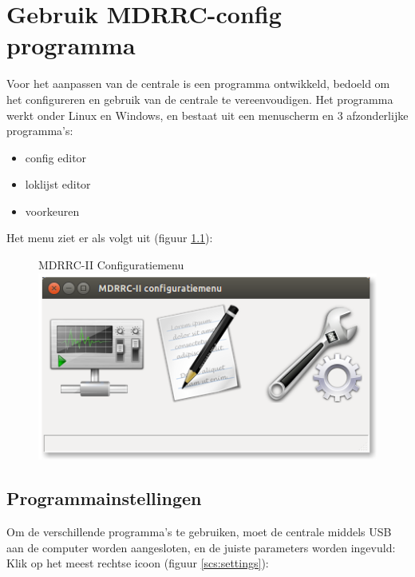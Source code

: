 \documentclass[12pt,a4paper]{report}
\begin{document}

\chapter{Gebruik MDRRC-config programma}
\label{ch:config}
Voor het aanpassen van de centrale is een programma ontwikkeld, bedoeld om het configureren en gebruik van de centrale te vereenvoudigen.
Het programma werkt onder Linux en Windows, en bestaat uit een menuscherm en 3 afzonderlijke programma's:
\begin{itemize}
\item config editor
\item loklijst editor
\item voorkeuren
\end{itemize}

Het menu ziet er als volgt uit (figuur \ref{scs:menu}):\\

\begin{figure}[ht]
  \captionbox
  {MDRRC-II Configuratiemenu\label{scs:menu}}
  {\includegraphics[scale=0.5]{images/rcu_screenshot1}\\}
\end{figure}

\section{Programmainstellingen}

Om de verschillende programma's te gebruiken, moet de centrale middels USB aan de computer worden aangesloten, en de juiste parameters worden ingevuld:
Klik op het meest rechtse icoon (figuur \ref{scs:settings}):
\end{document}
